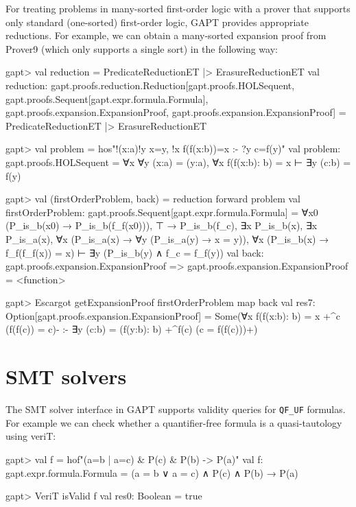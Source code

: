 \documentclass[a4paper,11pt]{book}
\begin{document}
For treating problems in many-sorted first-order logic with a prover that supports only
standard (one-sorted) first-order logic, GAPT provides appropriate reductions.
For example, we can obtain a many-sorted expansion proof from Prover9
(which only supports a single sort) in the following way:
\begin{clilisting}
  gapt> val reduction = PredicateReductionET |> ErasureReductionET
  val reduction:
  gapt.proofs.reduction.Reduction[gapt.proofs.HOLSequent,
      gapt.proofs.Sequent[gapt.expr.formula.Formula],
      gapt.proofs.expansion.ExpansionProof, gapt.proofs.expansion.ExpansionProof] = PredicateReductionET |> ErasureReductionET

  gapt> val problem = hos"!(x:a)!y x=y, !x f(f(x:b))=x :- ?y c=f(y)"
  val problem: gapt.proofs.HOLSequent = ∀x ∀y (x:a) = (y:a), ∀x f(f(x:b): b) = x ⊢ ∃y (c:b) = f(y)

  gapt> val (firstOrderProblem, back) = reduction forward problem
  val firstOrderProblem: gapt.proofs.Sequent[gapt.expr.formula.Formula] = ∀x0 (P_is_b(x0) → P_is_b(f_f(x0))),
  ⊤ → P_is_b(f_c),
  ∃x P_is_b(x),
  ∃x P_is_a(x),
  ∀x (P_is_a(x) → ∀y (P_is_a(y) → x = y)),
  ∀x (P_is_b(x) → f_f(f_f(x)) = x)
  ⊢
  ∃y (P_is_b(y) ∧ f_c = f_f(y))
  val back: gapt.proofs.expansion.ExpansionProof =>
  gapt.proofs.expansion.ExpansionProof = <function>

  gapt> Escargot getExpansionProof firstOrderProblem map back
  val res7: Option[gapt.proofs.expansion.ExpansionProof] = Some(∀x f(f(x:b): b) = x +^{c} (f(f(c)) = c)-
  :-
  ∃y (c:b) = (f(y:b): b) +^{f(c)} (c = f(f(c)))+)

\end{clilisting}

\section{SMT solvers}

The SMT solver interface in GAPT supports validity queries for \verb,QF_UF,
formulas.  For example we can check whether a quantifier-free formula is a
quasi-tautology using veriT:
\begin{clilisting}
  gapt> val f = hof"(a=b | a=c) & P(c) & P(b) -> P(a)"
  val f: gapt.expr.formula.Formula = (a = b ∨ a = c) ∧ P(c) ∧ P(b) → P(a)

\end{clilisting}

\begin{clilisting}
  gapt> VeriT isValid f
  val res0: Boolean = true

\end{clilisting}
\end{document}
